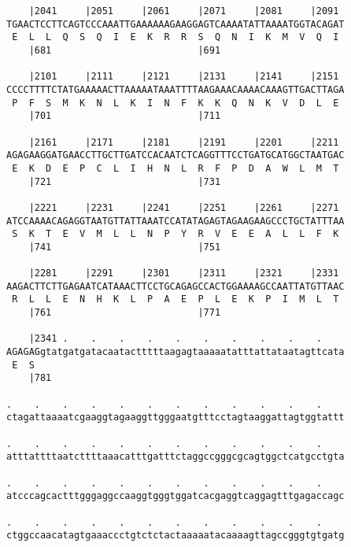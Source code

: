\documentclass{article}
\begin{document}
\begin{Verbatim}
    |2041     |2051     |2061     |2071     |2081     |2091 
TGAACTCCTTCAGTCCCAAATTGAAAAAAGAAGGAGTCAAAATATTAAAATGGTACAGAT
 E  L  L  Q  S  Q  I  E  K  R  R  S  Q  N  I  K  M  V  Q  I 
    |681                          |691                      
  
    |2101     |2111     |2121     |2131     |2141     |2151 
CCCCTTTTCTATGAAAAACTTAAAAATAAATTTTAAGAAACAAAACAAAGTTGACTTAGA
 P  F  S  M  K  N  L  K  I  N  F  K  K  Q  N  K  V  D  L  E 
    |701                          |711                      
  
    |2161     |2171     |2181     |2191     |2201     |2211 
AGAGAAGGATGAACCTTGCTTGATCCACAATCTCAGGTTTCCTGATGCATGGCTAATGAC
 E  K  D  E  P  C  L  I  H  N  L  R  F  P  D  A  W  L  M  T 
    |721                          |731                      
  
    |2221     |2231     |2241     |2251     |2261     |2271 
ATCCAAAACAGAGGTAATGTTATTAAATCCATATAGAGTAGAAGAAGCCCTGCTATTTAA
 S  K  T  E  V  M  L  L  N  P  Y  R  V  E  E  A  L  L  F  K 
    |741                          |751                      
  
    |2281     |2291     |2301     |2311     |2321     |2331 
AAGACTTCTTGAGAATCATAAACTTCCTGCAGAGCCACTGGAAAAGCCAATTATGTTAAC
 R  L  L  E  N  H  K  L  P  A  E  P  L  E  K  P  I  M  L  T 
    |761                          |771                      
  
    |2341 .    .    .    .    .    .    .    .    .    .    
AGAGAGgtatgatgatacaatactttttaagagtaaaaatatttattataatagttcata
 E  S                                                       
    |781                                                    
  
.    .    .    .    .    .    .    .    .    .    .    .    
ctagattaaaatcgaaggtagaaggttgggaatgtttcctagtaaggattagtggtattt
                                                            
.    .    .    .    .    .    .    .    .    .    .    .    
atttattttaatcttttaaacatttgatttctaggccgggcgcagtggctcatgcctgta
                                                            
.    .    .    .    .    .    .    .    .    .    .    .    
atcccagcactttgggaggccaaggtgggtggatcacgaggtcaggagtttgagaccagc
                                                            
.    .    .    .    .    .    .    .    .    .    .    .    
ctggccaacatagtgaaaccctgtctctactaaaaatacaaaagttagccgggtgtgatg
                                                            

\end{Verbatim}
\end{document}
